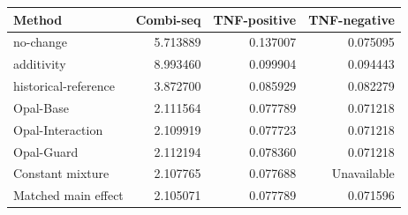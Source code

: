 \begin{tabular}{lrrr}
\toprule
Method & Combi-seq & TNF-positive & TNF-negative \\
\midrule
no-change & 5.713889 & 0.137007 & 0.075095 \\
additivity & 8.993460 & 0.099904 & 0.094443 \\
historical-reference & 3.872700 & 0.085929 & 0.082279 \\
Opal-Base & 2.111564 & 0.077789 & 0.071218 \\
Opal-Interaction & 2.109919 & 0.077723 & 0.071218 \\
Opal-Guard & 2.112194 & 0.078360 & 0.071218 \\
Constant mixture & 2.107765 & 0.077688 & Unavailable \\
Matched main effect & 2.105071 & 0.077789 & 0.071596 \\
\bottomrule
\end{tabular}
